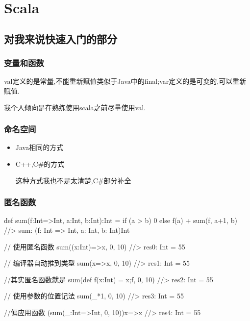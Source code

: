 \chapter{Scala}

\section{对我来说快速入门的部分}

\subsection{变量和函数}

val定义的是常量,不能重新赋值类似于Java中的final;var定义的是可变的,可以重新赋值.

我个人倾向是在熟练使用scala之前尽量使用val.

\subsection{命名空间}

\begin{itemize}
\item Java相同的方式
\item C++,C\#的方式

这种方式我也不是太清楚,C\#部分补全
\end{itemize}

\subsection{匿名函数}

\begin{Scala}
	def sum(f:Int=>Int, a:Int, b:Int):Int = {
		if (a > b)
			0
		else
			f(a) + sum(f, a+1, b)
	}                                         //> sum: (f: Int => Int, a: Int, b: Int)Int
	
	// 使用匿名函数
	sum((x:Int)=>x, 0, 10)                    //> res0: Int = 55
	
	// 编译器自动推到类型
	sum(x=>x, 0, 10)                          //> res1: Int = 55
	
	//其实匿名函数就是
	sum({def f(x:Int) = x;f}, 0, 10)          //> res2: Int = 55

	// 使用参数的位置记法
	sum({_*1}, 0, 10)                         //> res3: Int = 55
	
	//偏应用函数
	(sum(_:Int=>Int, 0, 10)){x=>x}            //> res4: Int = 55
	
	
\end{Scala}

